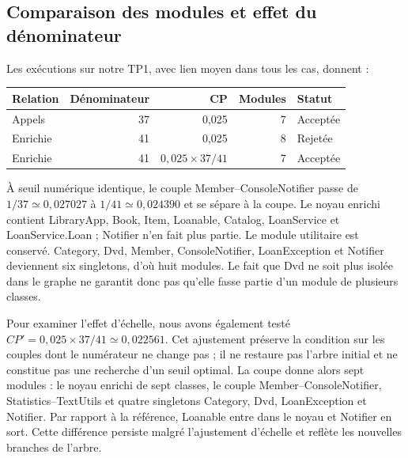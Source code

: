 \documentclass[11pt,a4paper]{article}
\begin{document}
\subsection{Comparaison des modules et effet du dénominateur}
Les exécutions sur notre TP1, avec lien moyen dans tous les cas, donnent :
\begin{center}
\begin{tabular}{lrrrl}
Relation & Dénominateur & CP & Modules & Statut \\
\hline
Appels & 37 & 0,025 & 7 & Acceptée \\
Enrichie & 41 & 0,025 & 8 & Rejetée \\
Enrichie & 41 & $0,025\times37/41$ & 7 & Acceptée
\end{tabular}
\end{center}
À seuil numérique identique, le couple Member--ConsoleNotifier passe de
$1/37\simeq0{,}027027$ à $1/41\simeq0{,}024390$ et se sépare à la coupe.
Le noyau enrichi contient LibraryApp, Book, Item, Loanable, Catalog,
LoanService et LoanService.Loan ; Notifier n'en fait plus partie.
Le module utilitaire est conservé. Category, Dvd, Member, ConsoleNotifier,
LoanException et Notifier deviennent six singletons, d'où huit modules.
Le fait que Dvd ne soit plus isolée dans le graphe ne garantit donc pas
qu'elle fasse partie d'un module de plusieurs classes.

Pour examiner l'effet d'échelle, nous avons également testé
$CP'=0{,}025\times37/41\simeq0{,}022561$. Cet ajustement préserve la condition
sur les couples dont le numérateur ne change pas ; il ne restaure pas l'arbre
initial et ne constitue pas une recherche d'un seuil optimal.
La coupe donne alors sept modules : le noyau enrichi de sept classes, le
couple Member--ConsoleNotifier, Statistics--TextUtils et quatre singletons
Category, Dvd, LoanException et Notifier. Par rapport à la référence, Loanable
entre dans le noyau et Notifier en sort. Cette différence persiste malgré
l'ajustement d'échelle et reflète les nouvelles branches de l'arbre.
\end{document}
